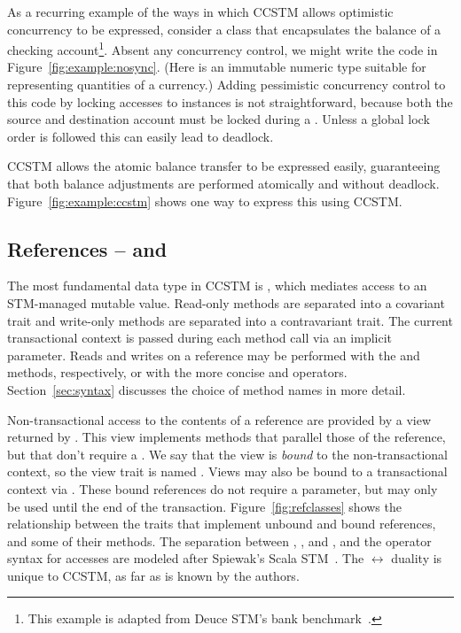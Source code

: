 



As a recurring example of the ways in which CCSTM allows optimistic concurrency
to be expressed, consider a class that encapsulates the balance of a
checking account\footnote{This example is adapted from Deuce STM's bank
benchmark~\cite{deucestm}.}.  Absent any concurrency control, we might
write the code in Figure~\ref{fig:example:nosync}.  (Here 
is an immutable numeric type suitable for representing quantities of
a currency.)  Adding pessimistic concurrency control to this code by
locking accesses to  instances is not straightforward,
because both the source and destination account must be locked during
a .  Unless a global lock order is followed this can
easily lead to deadlock.

%

CCSTM allows the atomic balance transfer to be expressed easily,
guaranteeing that both balance adjustments are performed atomically and
without deadlock.  Figure~\ref{fig:example:ccstm} shows one way to
express this using CCSTM.


\subsection{References --  and }

The most fundamental data type in CCSTM is , which mediates
access to an STM-managed mutable value.  Read-only methods are separated into a
covariant  trait and write-only methods are separated into a
contravariant  trait.  The current transactional context is passed
during
each method call via an implicit parameter.  Reads and writes on a
reference may be performed with the  and  methods,
respectively, or with the more concise  and \code{:=}
operators.  Section~\ref{sec:syntax} discusses
the choice of method names in more detail.

Non-transactional access to the contents of a reference are provided by a view
returned by .  This view implements methods that parallel those of
the reference, but that don't require a .  We say that the view
is \textit{bound} to the non-transactional context, so the view trait is
named .  Views may also be bound to a transactional context
via .  These bound references do not require a 
parameter, but may only be used until the end of the transaction.
Figure~\ref{fig:refclasses} shows the
 relationship between the traits that implement unbound
and bound references, and some of their methods.  The separation between
, , and , and the operator syntax for
accesses are modeled after Spiewak's Scala STM~\cite{github:spiewak}.
The  $ \leftrightarrow $  duality is unique
to CCSTM, as far as is known by the authors.

